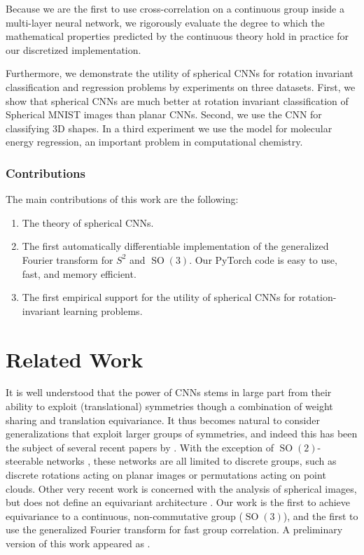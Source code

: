 \documentclass{article} %
\newcommand{\SO}[1]{\ensuremath{\operatorname{SO}(#1)}}
\begin{document}
Because we are the first to use cross-correlation on a continuous group inside a multi-layer neural network, we rigorously evaluate the degree to which the mathematical properties predicted by the continuous theory hold in practice for our discretized implementation.

Furthermore, we demonstrate the utility of spherical CNNs for rotation invariant classification and regression problems by experiments on three datasets.
First, we show that spherical CNNs are much better at rotation invariant classification of Spherical MNIST images than planar CNNs.
Second, we use the CNN for classifying 3D shapes.
In a third experiment we use the model for molecular energy regression, an important problem in computational chemistry.

\subsubsection*{Contributions}
The main contributions of this work are the following:
\begin{enumerate}
    \item The theory of spherical CNNs.
    \item The first automatically differentiable implementation of the generalized Fourier transform for $S^2$ and $\SO3$.
    Our PyTorch code is easy to use, fast, and memory efficient.
    \item The first empirical support for the utility of spherical CNNs for rotation-invariant learning problems.
\end{enumerate}


\section{Related Work}

It is well understood that the power of CNNs stems in large part from their ability to exploit (translational) symmetries though a combination of weight sharing and translation equivariance.
It thus becomes natural to consider generalizations that exploit larger groups of symmetries, and indeed this has been the subject of several recent papers by \cite{Gensa, Olah2014, Dieleman2015, Dieleman2016, Cohen2016, Ravanbakhsh2016, manzil_deepsets, Guttenberg2016, Cohen2017}.
With the exception of $\SO2$-steerable networks \citep{Worrall2017-gl,Weiler2017-wc}, these networks are all limited to discrete groups, such as discrete rotations acting on planar images or permutations acting on point clouds.
Other very recent work is concerned with the analysis of spherical images, but does not define an equivariant architecture \citep{Su2017-vm,Boomsma2017-rl}.
Our work is the first to achieve equivariance to a continuous, non-commutative group ($\SO3$), and the first to use the generalized Fourier transform for fast group correlation.
A preliminary version of this work appeared as \cite{Cohen17b}.
\end{document}
